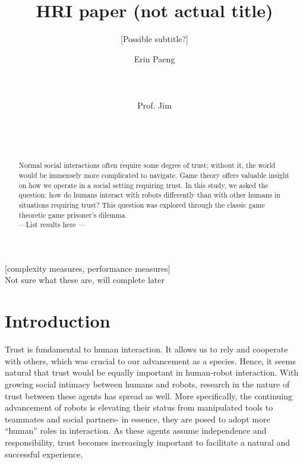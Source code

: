 \documentclass{sig-alternate}
\begin{document}
\title{HRI paper (not actual title)}
\subtitle{[Possible subtitle?]}

\author{
\alignauthor
Erin Paeng\\
       \\
       \\
       \\
\alignauthor
Prof. Jim\\
       \\
       \\
       \\
       }

\maketitle
\begin{abstract}
Normal social interactions often require some degree of trust; without it, the world would be immensely more complicated to navigate. Game theory offers valuable insight on how we operate in a social setting requiring trust. In this study, we asked the question: how do humans interact with robots differently than with other humans in situations requiring trust? This question was explored through the classic game theoretic game prisoner's dilemma.\\ ---List results here ---
\end{abstract}

[complexity measures, performance measures]
\\Not sure what these are, will complete later



\section{Introduction}
Trust is fundamental to human interaction. It allows us to rely and cooperate with others, which was crucial to our advancement as a species. Hence, it seems natural that trust would be equally important in human-robot interaction. With growing social intimacy between humans and robots, research in the nature of trust between these agents has spread as well. More specifically, the continuing advancement of robots is elevating their status from manipulated tools to teammates and social partners- in essence, they are posed to adopt more ``human'' roles in interaction. As these agents assume independence and responsibility, trust becomes increasingly important to facilitate a natural and successful experience.
\end{document}
